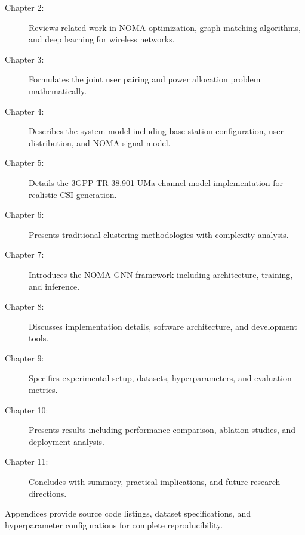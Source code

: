 \begin{description}
    \item[Chapter 2:] Reviews related work in NOMA optimization, graph matching algorithms, and deep learning for wireless networks.
    
    \item[Chapter 3:] Formulates the joint user pairing and power allocation problem mathematically.
    
    \item[Chapter 4:] Describes the system model including base station configuration, user distribution, and NOMA signal model.
    
    \item[Chapter 5:] Details the 3GPP TR 38.901 UMa channel model implementation for realistic CSI generation.
    
    \item[Chapter 6:] Presents traditional clustering methodologies with complexity analysis.
    
    \item[Chapter 7:] Introduces the NOMA-GNN framework including architecture, training, and inference.
    
    \item[Chapter 8:] Discusses implementation details, software architecture, and development tools.
    
    \item[Chapter 9:] Specifies experimental setup, datasets, hyperparameters, and evaluation metrics.
    
    \item[Chapter 10:] Presents results including performance comparison, ablation studies, and deployment analysis.
    
    \item[Chapter 11:] Concludes with summary, practical implications, and future research directions.
\end{description}

Appendices provide source code listings, dataset specifications, and hyperparameter configurations for complete reproducibility.
